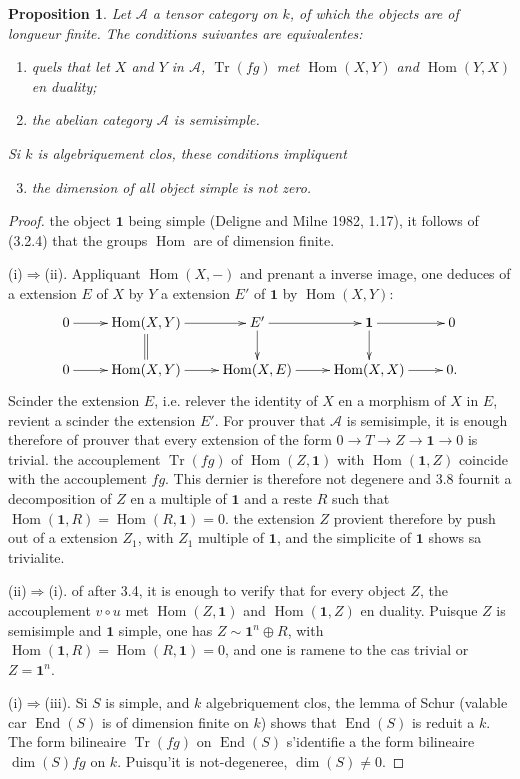 \documentclass[11pt,a4paper]{article}
\theoremstyle{plain}
\newtheorem{proposition}[theorem]{Proposition}
\theoremstyle{definition}
\DeclareMathOperator{\Hom}{Hom}
\DeclareMathOperator{\End}{End}
\DeclareMathOperator{\Tr}{Tr}
\begin{document}
\begin{proposition}
Let $\mathcal{A}$ a tensor category on $k$, of which the objects are of longueur finite. The conditions suivantes are equivalentes:
\begin{enumerate}[label=(\roman*)]
\item quels that let $X$ and $Y$ in $\mathcal{A}$, $\Tr(fg)$ met $\Hom(X, Y)$ and $\Hom(Y, X)$ en duality;
\item the abelian category $\mathcal{A}$ is semisimple.
\end{enumerate}
Si $k$ is algebriquement clos, these conditions impliquent
\begin{enumerate}[label=(\roman*)]
\setcounter{enumi}{2}
\item the dimension of all object simple is not zero.
\end{enumerate}
\end{proposition}

\begin{proof}
the object $\mathbf{1}$ being simple (Deligne and Milne 1982, 1.17), it follows of (3.2.4) that the groups $\Hom$ are of dimension finite.

(i)$\Rightarrow$(ii). Appliquant $\Hom(X, -)$ and prenant a inverse image, one deduces of a extension $E$ of $X$ by $Y$ a extension $E'$ of $\mathbf{1}$ by $\Hom(X, Y)$:
\[
\xymatrix@R=1.5pc{
0 \ar[r] & \Hom(X, Y) \ar[r] \ar@{=}[d] & E' \ar[r] \ar[d] & \mathbf{1} \ar[r] \ar[d] & 0 \\
0 \ar[r] & \Hom(X, Y) \ar[r] & \Hom(X, E) \ar[r] & \Hom(X, X) \ar[r] & 0.
}
\]
Scinder the extension $E$, i.e. relever the identity of $X$ en a morphism of $X$ in $E$, revient a scinder the extension $E'$. For prouver that $\mathcal{A}$ is semisimple, it is enough therefore of prouver that every extension of the form $0 \to T \to Z \to \mathbf{1} \to 0$ is trivial. the accouplement $\Tr(fg)$ of $\Hom(Z, \mathbf{1})$ with $\Hom(\mathbf{1}, Z)$ coincide with the accouplement $fg$. This dernier is therefore not degenere and 3.8 fournit a decomposition of $Z$ en a multiple of $\mathbf{1}$ and a reste $R$ such that $\Hom(\mathbf{1}, R) = \Hom(R, \mathbf{1}) = 0$. the extension $Z$ provient therefore by push out of a extension $Z_1$, with $Z_1$ multiple of $\mathbf{1}$, and the simplicite of $\mathbf{1}$ shows sa trivialite.

(ii)$\Rightarrow$(i). of after 3.4, it is enough to verify that for every object $Z$, the accouplement $v \circ u$ met $\Hom(Z, \mathbf{1})$ and $\Hom(\mathbf{1}, Z)$ en duality. Puisque $Z$ is semisimple and $\mathbf{1}$ simple, one has $Z \sim \mathbf{1}^n \oplus R$, with $\Hom(\mathbf{1}, R) = \Hom(R, \mathbf{1}) = 0$, and one is ramene to the cas trivial or $Z = \mathbf{1}^n$.

(i)$\Rightarrow$(iii). Si $S$ is simple, and $k$ algebriquement clos, the lemma of Schur (valable car $\End(S)$ is of dimension finite on $k$) shows that $\End(S)$ is reduit a $k$. The form bilineaire $\Tr(fg)$ on $\End(S)$ s'identifie a the form bilineaire $\dim(S) fg$ on $k$. Puisqu'it is not-degeneree, $\dim(S) \neq 0$.
\end{proof}
\end{document}
